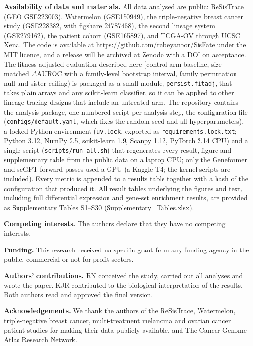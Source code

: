 \documentclass[11pt,a4paper]{article}
\begin{document}
\textbf{Availability of data and materials.} All data analysed are public: ReSisTrace (GEO GSE223003), Watermelon (GSE150949), the triple-negative breast cancer study (GSE228382, with figshare 24787458), the second lineage system (GSE279162), the patient cohort (GSE165897), and TCGA-OV through UCSC Xena. The code is available at https://github.com/rabeyanoor/SisFate under the MIT licence, and a release will be archived at Zenodo with a DOI on acceptance. The fitness-adjusted evaluation described here (control-arm baseline, size-matched $\Delta$AUROC with a family-level bootstrap interval, family permutation null and sister ceiling) is packaged as a small module, \texttt{persist.fitadj}, that takes plain arrays and any scikit-learn classifier, so it can be applied to other lineage-tracing designs that include an untreated arm. The repository contains the analysis package, one numbered script per analysis step, the configuration file (\texttt{configs/default.yaml}, which fixes the random seed and all hyperparameters), a locked Python environment (\texttt{uv.lock}, exported as \texttt{requirements.lock.txt}; Python 3.12, NumPy 2.5, scikit-learn 1.9, Scanpy 1.12, PyTorch 2.14 CPU) and a single script (\texttt{scripts/run\_all.sh}) that regenerates every result, figure and supplementary table from the public data on a laptop CPU; only the Geneformer and scGPT forward passes used a GPU (a Kaggle T4; the kernel scripts are included). Every metric is appended to a results table together with a hash of the configuration that produced it. All result tables underlying the figures and text, including full differential expression and gene-set enrichment results, are provided as Supplementary Tables S1--S30 (Supplementary\_Tables.xlsx).

\textbf{Competing interests.} The authors declare that they have no competing interests.

\textbf{Funding.} This research received no specific grant from any funding agency in the public, commercial or not-for-profit sectors.

\textbf{Authors' contributions.} RN conceived the study, carried out all analyses and wrote the paper. KJR contributed to the biological interpretation of the results. Both authors read and approved the final version.

\textbf{Acknowledgements.} We thank the authors of the ReSisTrace, Watermelon, triple-negative breast cancer, multi-treatment melanoma and ovarian cancer patient studies for making their data publicly available, and The Cancer Genome Atlas Research Network.
\end{document}
